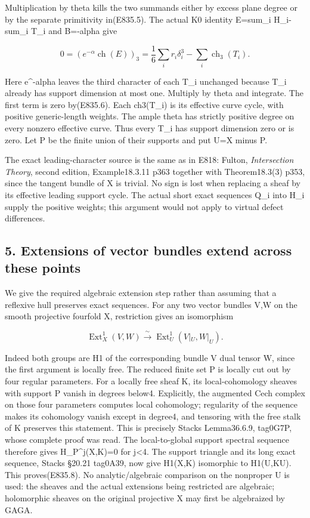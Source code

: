 Multiplication by theta kills the two summands either by excess plane
degree or by the separate primitivity in(E835.5). The actual K0 identity
E=sum\_i H\_i-sum\_i T\_i and B=-alpha give

\[
 0=\left(e^{-\alpha}\operatorname{ch}(E)\right)_3
     =\frac16\sum_i r_i\delta_i^3-\sum_i\operatorname{ch}_3(T_i).
 \tag{E835.7}
\]

Here e\^{}-alpha leaves the third character of each T\_i unchanged
because T\_i already has support dimension at most one. Multiply by
theta and integrate. The first term is zero by(E835.6). Each ch3(T\_i)
is its effective curve cycle, with positive generic-length weights. The
ample theta has strictly positive degree on every nonzero effective
curve. Thus every T\_i has support dimension zero or is zero. Let P be
the finite union of their supports and put U=X minus P.

The exact leading-character source is the same as in E818: Fulton,
\emph{Intersection Theory}, second edition, Example18.3.11 p363 together
with Theorem18.3(3) p353, since the tangent bundle of X is trivial. No
sign is lost when replacing a sheaf by its effective leading support
cycle. The actual short exact sequences Q\_i into H\_i supply the
positive weights; this argument would not apply to virtual defect
differences.

\subsection{5. Extensions of vector bundles extend across these
points}\label{SF-E835:extensions-of-vector-bundles-extend-across-these-points}

We give the required algebraic extension step rather than assuming that
a reflexive hull preserves exact sequences. For any two vector bundles
V,W on the smooth projective fourfold X, restriction gives an
isomorphism

\[
 \operatorname{Ext}^1_X(V,W)
       \xrightarrow{\ \sim\ }
 \operatorname{Ext}^1_U(V|_U,W|_U).
 \tag{E835.8}
\]

Indeed both groups are H1 of the corresponding bundle V dual tensor W,
since the first argument is locally free. The reduced finite set P is
locally cut out by four regular parameters. For a locally free sheaf K,
its local-cohomology sheaves with support P vanish in degrees below4.
Explicitly, the augmented Cech complex on those four parameters computes
local cohomology; regularity of the sequence makes its cohomology vanish
except in degree4, and tensoring with the free stalk of K preserves this
statement. This is precisely Stacks Lemma36.6.9, tag0G7P, whose complete
proof was read. The local-to-global support spectral sequence therefore
gives H\_P\^{}j(X,K)=0 for j\textless4. The support triangle and its
long exact sequence, Stacks §20.21 tag0A39, now give H1(X,K) isomorphic
to H1(U,K\textbar U). This proves(E835.8). No analytic/algebraic
comparison on the nonproper U is used: the sheaves and the actual
extensions being restricted are algebraic; holomorphic sheaves on the
original projective X may first be algebraized by GAGA.


